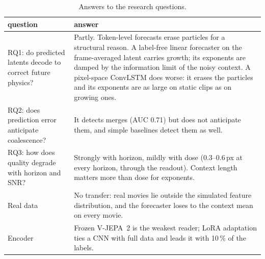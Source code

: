 \begin{table}[H]
  \centering
  \caption{Answers to the research questions.}
  \label{tab:summary}
  \begin{tabular}{>{\raggedright\arraybackslash}p{4.2cm}>{\raggedright\arraybackslash}p{9.8cm}}
    \toprule
    question & answer \\
    \midrule
    RQ1: do predicted latents decode to correct future physics?
      & Partly. Token-level forecasts erase particles for a structural reason. A
        label-free linear forecaster on the frame-averaged latent carries growth; its
        exponents are damped by the information limit of the noisy context. A
        pixel-space ConvLSTM does worse: it erases the particles and its exponents are
        as large on static clips as on growing ones. \\ \addlinespace
    RQ2: does prediction error anticipate coalescence?
      & It detects merges (AUC 0.71) but does not anticipate them, and simple baselines
        detect them as well. \\ \addlinespace
    RQ3: how does quality degrade with horizon and SNR?
      & Strongly with horizon, mildly with dose (0.3--0.6\,px at every horizon, through
        the readout). Context length matters more than dose for exponents. \\ \addlinespace
    Real data
      & No transfer: real movies lie outside the simulated feature distribution, and the
        forecaster loses to the context mean on every movie. \\ \addlinespace
    Encoder
      & Frozen V-JEPA~2 is the weakest reader; LoRA adaptation ties a CNN with full data
        and leads it with 10\,\% of the labels. \\
    \bottomrule
  \end{tabular}
\end{table}
